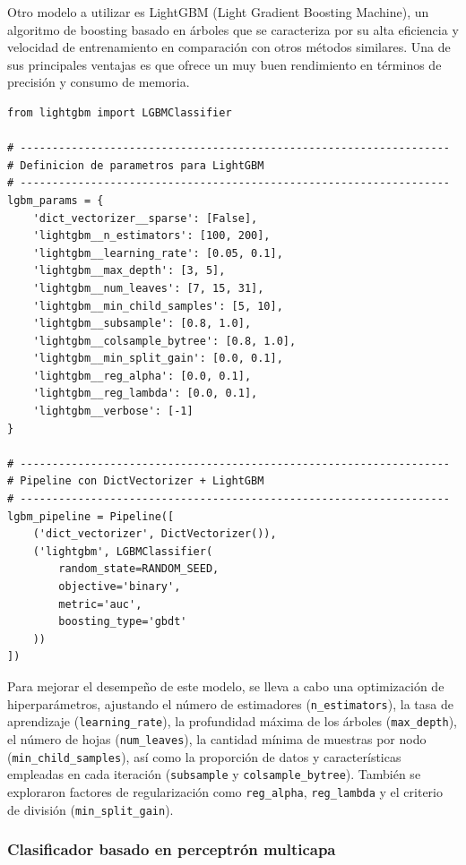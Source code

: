 \documentclass[11pt,a4paper,spanish]{book}
\numberwithin{equation}{chapter}
\numberwithin{figure}{chapter}
\begin{document}
Otro modelo a utilizar es LightGBM (Light Gradient Boosting Machine), un algoritmo de boosting basado en árboles que se caracteriza por su alta eficiencia y velocidad de entrenamiento en comparación con otros métodos similares. Una de sus principales ventajas es que ofrece un muy buen rendimiento en términos de precisión y consumo de memoria. 


\vspace{5mm}
\begin{lstlisting}
from lightgbm import LGBMClassifier

# -------------------------------------------------------------------
# Definicion de parametros para LightGBM
# -------------------------------------------------------------------
lgbm_params = {
    'dict_vectorizer__sparse': [False],
    'lightgbm__n_estimators': [100, 200],
    'lightgbm__learning_rate': [0.05, 0.1],  
    'lightgbm__max_depth': [3, 5],  
    'lightgbm__num_leaves': [7, 15, 31],  
    'lightgbm__min_child_samples': [5, 10],  
    'lightgbm__subsample': [0.8, 1.0],
    'lightgbm__colsample_bytree': [0.8, 1.0],
    'lightgbm__min_split_gain': [0.0, 0.1],  
    'lightgbm__reg_alpha': [0.0, 0.1],  
    'lightgbm__reg_lambda': [0.0, 0.1],  
    'lightgbm__verbose': [-1]  
}

# -------------------------------------------------------------------
# Pipeline con DictVectorizer + LightGBM
# -------------------------------------------------------------------
lgbm_pipeline = Pipeline([
    ('dict_vectorizer', DictVectorizer()),
    ('lightgbm', LGBMClassifier(
        random_state=RANDOM_SEED,
        objective='binary',
        metric='auc',
        boosting_type='gbdt'
    ))
])
\end{lstlisting}

Para mejorar el desempeño de este modelo, se lleva a cabo una optimización de hiperparámetros, ajustando el número de estimadores (\lstinline|n_estimators|), la tasa de aprendizaje (\lstinline|learning_rate|), la profundidad máxima de los árboles (\lstinline|max_depth|), el número de hojas (\lstinline|num_leaves|), la cantidad mínima de muestras por nodo (\lstinline|min_child_samples|), así como la proporción de datos y características empleadas en cada iteración (\lstinline|subsample| y \lstinline|colsample_bytree|). También se exploraron factores de regularización como \lstinline|reg_alpha|, \lstinline|reg_lambda| y el criterio de división (\lstinline|min_split_gain|). 



\subsubsection{Clasificador basado en perceptrón multicapa}
\end{document}
